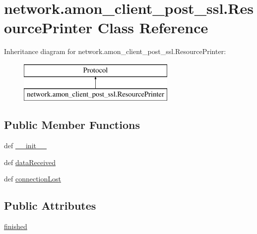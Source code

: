 \hypertarget{classnetwork_1_1amon__client__post__ssl_1_1_resource_printer}{\section{network.\-amon\-\_\-client\-\_\-post\-\_\-ssl.\-Resource\-Printer Class Reference}
\label{classnetwork_1_1amon__client__post__ssl_1_1_resource_printer}
}
Inheritance diagram for network.\-amon\-\_\-client\-\_\-post\-\_\-ssl.\-Resource\-Printer\-:\begin{figure}[H]
\begin{center}
\leavevmode
\includegraphics[height=2.000000cm]{d2/d24/classnetwork_1_1amon__client__post__ssl_1_1_resource_printer}
\end{center}
\end{figure}
\subsection*{Public Member Functions}
\begin{DoxyCompactItemize}
\item 
def \hyperlink{classnetwork_1_1amon__client__post__ssl_1_1_resource_printer_a536cd7f79c314ba996d0b074aad25685}{\-\_\-\-\_\-init\-\_\-\-\_\-}
\item 
def \hyperlink{classnetwork_1_1amon__client__post__ssl_1_1_resource_printer_a532f23d7f11cd609eb6011be2156dad2}{data\-Received}
\item 
def \hyperlink{classnetwork_1_1amon__client__post__ssl_1_1_resource_printer_afcc20d7dd3ea9fecbfe0fae764302f0a}{connection\-Lost}
\end{DoxyCompactItemize}
\subsection*{Public Attributes}
\begin{DoxyCompactItemize}
\item 
\hyperlink{classnetwork_1_1amon__client__post__ssl_1_1_resource_printer_ae87d11b59ea34375d073b598591b4fa0}{finished}
\end{DoxyCompactItemize}


